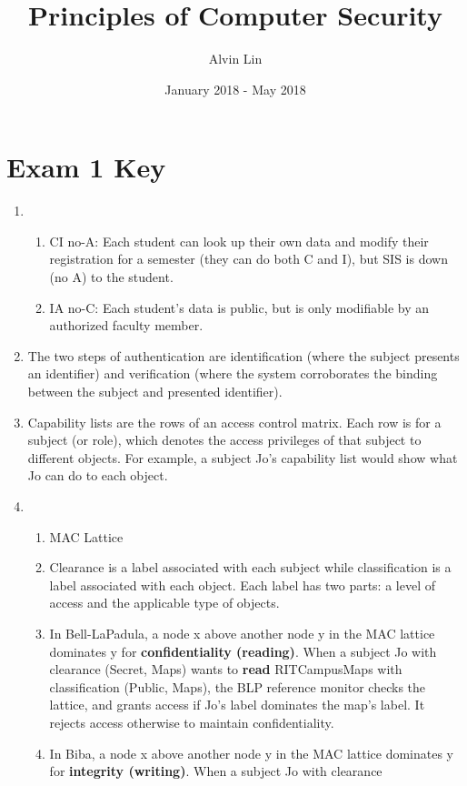 \documentclass{math}
\title{Principles of Computer Security}
\author{Alvin Lin}
\date{January 2018 - May 2018}
\begin{document}
\maketitle

\section*{Exam 1 Key}
\begin{enumerate}
  \item \begin{enumerate}
    \item CI no-A: Each student can look up their own data and modify their
    registration for a semester (they can do both C and I), but SIS is down (no
    A) to the student.
    \item IA no-C: Each student's data is public, but is only modifiable by
    an authorized faculty member.
  \end{enumerate}
  \item The two steps of authentication are identification (where the subject
  presents an identifier) and verification (where the system corroborates the
  binding between the subject and presented identifier).
  \item Capability lists are the rows of an access control matrix. Each row is
  for a subject (or role), which denotes the access privileges of that subject
  to different objects. For example, a subject Jo's capability list would show
  what Jo can do to each object.
  \item \begin{enumerate}
    \item MAC Lattice
    \item Clearance is a label associated with each subject while
    classification is a label associated with each object. Each label has two
    parts: a level of access and the applicable type of objects.
    \item In Bell-LaPadula, a node x above another node y in the MAC lattice
    dominates y for \textbf{confidentiality (reading)}. When a subject Jo with
    clearance (Secret, {Maps}) wants to \textbf{read} RITCampusMaps with
    classification (Public, {Maps}), the BLP reference monitor checks the
    lattice, and grants access if Jo's label dominates the map's label. It
    rejects access otherwise to maintain confidentiality.
    \item In Biba, a node x above another node y in the MAC lattice dominates
    y for \textbf{integrity (writing)}. When a subject Jo with clearance

\end{enumerate}
\end{enumerate}
\end{document}

